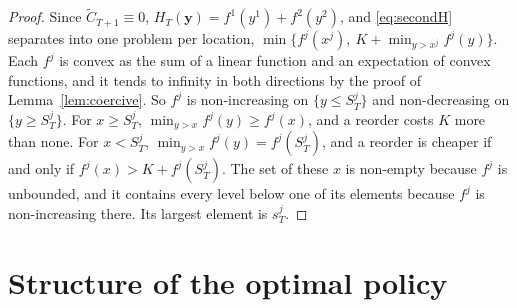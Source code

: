 \documentclass[11pt]{article}
\renewcommand{\vec}[1]{\boldsymbol{#1}}
\newcommand{\Ct}{\widetilde{C}}
\theoremstyle{definition}
\begin{document}
\begin{proof}
Since $\Ct_{T+1}\equiv0$, $H_T(\vec{y})=f^1(y^1)+f^2(y^2)$, and \eqref{eq:secondH} separates into one problem per location, $\min\{f^j(x^j),\ K+\min_{y>x^j}f^j(y)\}$. Each $f^j$ is convex as the sum of a linear function and an expectation of convex functions, and it tends to infinity in both directions by the proof of Lemma~\ref{lem:coercive}. So $f^j$ is non-increasing on $\{y\le S^j_T\}$ and non-decreasing on $\{y\ge S^j_T\}$. For $x\ge S^j_T$, $\min_{y>x}f^j(y)\ge f^j(x)$, and a reorder costs $K$ more than none. For $x<S^j_T$, $\min_{y>x}f^j(y)=f^j(S^j_T)$, and a reorder is cheaper if and only if $f^j(x)>K+f^j(S^j_T)$. The set of these $x$ is non-empty because $f^j$ is unbounded, and it contains every level below one of its elements because $f^j$ is non-increasing there. Its largest element is $s^j_T$.
\end{proof}

\section{Structure of the optimal policy}\label{sec:theorem}
\end{document}
